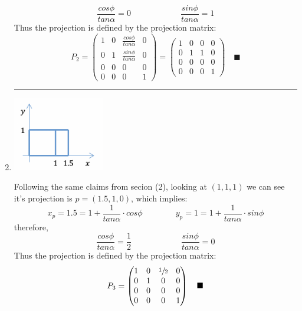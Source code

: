 \documentclass{article}
\newcommand{\proofend}{\quad\blacksquare}
\newcommand{\separator}{\vspace{.3cm}\begin{center}\noindent\rule{15cm}{0.4pt}\end{center}\vspace{.3cm}}
\newcommand{\twoColumns}[4]{
    \begin{minipage}{#1\linewidth}#3\end{minipage}
    \begin{minipage}{#2\linewidth}#4\end{minipage}
}
\begin{document}
\begin{enumerate}
{$$                \dfrac{cos\phi}{tan\alpha} = 0\qquad\qquad\qquad
                \dfrac{sin\phi}{tan\alpha} = 1
            $$
            Thus the projection is defined by the projection matrix:
            $$
                P_2 = \begin{pmatrix}
                    1&0&\frac{cos\phi}{tan\alpha}&0\\
                    0&1&\frac{sin\phi}{tan\alpha}&0\\
                    0&0&0&0\\
                    0&0&0&1
                \end{pmatrix} =
                \begin{pmatrix}
                    1&0&0&0\\
                    0&1&1&0\\
                    0&0&0&0\\
                    0&0&0&1
                \end{pmatrix}\proofend
            $$
        }
        \separator
        \item \twoColumns{0.25}{0.75}{
            \centering
            \includegraphics[width=4cm]{q3_3.png}
        }{
            Following the same claims from secion (2), looking at $(1,1,1)$ we can see it's projection is $p = (1.5, 1, 0)$, which implies:
            $$
                x_p = 1.5 = 1 + \dfrac{1}{tan\alpha}\cdot cos\phi\qquad\qquad
                y_p = 1 = 1 + \dfrac{1}{tan\alpha}\cdot sin\phi
            $$
            therefore,
            $$
                \dfrac{cos\phi}{tan\alpha} = \dfrac{1}{2}\qquad\qquad\qquad
                \dfrac{sin\phi}{tan\alpha} = 0
            $$
            Thus the projection is defined by the projection matrix:
            $$
                P_3 = \begin{pmatrix}
                    1&0&\sfrac{1}{2}&0\\
                    0&1&0&0\\
                    0&0&0&0\\
                    0&0&0&1
                \end{pmatrix}\proofend
            $$
        }

\end{enumerate}
\end{document}
